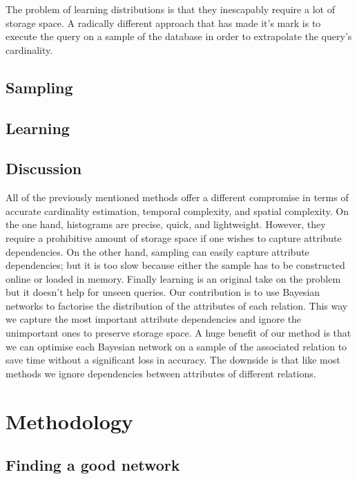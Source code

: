 \documentclass[runningheads]{llncs}
\begin{document}
The problem of learning distributions is that they inescapably require a lot of storage space. A radically different approach that has made it's mark is to execute the query on a sample of the database in order to extrapolate the query's cardinality.

\subsection{Sampling} \label{sec:sampling}




\subsection{Learning}


\subsection{Discussion}

All of the previously mentioned methods offer a different compromise in terms of accurate cardinality estimation, temporal complexity, and spatial complexity. On the one hand, histograms are precise, quick, and lightweight. However, they require a prohibitive amount of storage space if one wishes to capture attribute dependencies. On the other hand, sampling can easily capture attribute dependencies; but it is too slow because either the sample has to be constructed online or loaded in memory. Finally learning is an original take on the problem but it doesn't help for unseen queries. Our contribution is to use Bayesian networks to factorise the distribution of the attributes of each relation. This way we capture the most important attribute dependencies and ignore the unimportant ones to preserve storage space. A huge benefit of our method is that we can optimise each Bayesian network on a sample of the associated relation to save time without a significant loss in accuracy. The downside is that like most methods we ignore dependencies between attributes of different relations. 

\section{Methodology}

\subsection{Finding a good network} \label{sec:structure-learning}
\end{document}
